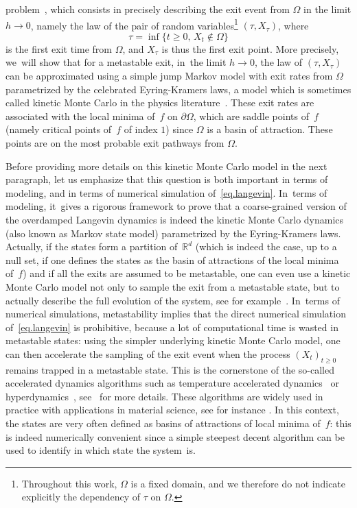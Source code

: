 problem~\cite{FrWe}, which consists in
precisely describing the exit event from $\Omega$ in the limit $h\to 0$, namely the law of the pair of random
variables\footnote{Throughout this work, $\Omega$ is a fixed domain, and
we therefore do not indicate explicitly the dependency of $\tau$
on $\Omega$.}
$(\tau,X_{\tau})$, where
\begin{equation}\label{eq:tau}
\tau=\inf\{t\ge 0, \, X_t\notin \Omega\}
\end{equation}
is the first exit time from $\Omega$, and $X_\tau$ is thus the first
exit point.
More precisely, we~will show that for a metastable exit, in~the limit
$h \to 0$, the law of $(\tau,X_{\tau})$ can be
approximated using a simple jump Markov model with exit rates from
$\Omega$ parametrized by the celebrated Eyring-Kramers laws, a model
which is sometimes called kinetic Monte Carlo in the physics
literature~\cite{voter-05}. These exit rates are associated with the
local minima of~$f$ on $\partial \Omega$, which are saddle points of~$f$ (namely critical points of~$f$ of index $1$) since $\Omega$ is a
basin of attraction. These points are on the most probable exit pathways from $\Omega$.

Before providing more details on this kinetic Monte Carlo model in the
next paragraph, let us emphasize that this question is both important in terms
of modeling, and in terms of numerical simulation of~\eqref{eq.langevin}. In~terms of
modeling, it~gives a rigorous framework to prove that a
coarse-grained version of the overdamped Langevin dynamics is indeed
the kinetic Monte Carlo dynamics (also known as Markov state model)
parametrized by the Eyring-Kramers laws. Actually, if the states form a partition of~$\mathbb R^d$ (which is indeed the case, up to a null set, if one defines the states as
the basin of attractions of the local minima of~$f$) and if all the exits are assumed to be metastable, one can even use a kinetic Monte Carlo model not only to
sample the exit from a metastable state, but to actually describe the
full evolution of the system, see for
example~\cite{cameron-14b,schuette-98, schuette-sarich-13,
voter-05,wales-03, pande2010everything}. In~terms of numerical simulations, metastability implies that the direct numerical simulation
of~\eqref{eq.langevin} is prohibitive, because a lot of computational time is wasted
in metastable states: using the simpler underlying kinetic Monte Carlo
model, one can then accelerate the sampling of the exit event when the
process $(X_t)_{t \ge 0}$ remains trapped in a metastable state. This
is the cornerstone of the so-called accelerated dynamics algorithms
such as {temperature accelerated
dynamics}~\cite{sorensen-voter-00} or
{hyperdynamics}~\cite{voter-97,tiwary2013metadynamics},
see~\cite{di-gesu-lelievre-le-peutrec-nectoux-17,lelievre-18,lelievre-perez-24} for more details. These algorithms are widely
used in practice with applications in material science,
see for instance
\cite{bai2010efficient,PhysRevLett87126101,PhysRevB66205415,fan-yip-yildiz-14}. In
this context, the states are very often defined as basins of attractions of local
minima of~$f$: this is indeed numerically convenient since a simple
steepest decent algorithm can be used to identify in which state the
system~is.

